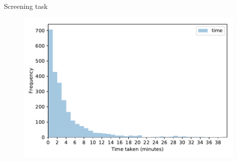 \documentclass[9pt]{beamer}
\begin{document}
\begin{frame}{Screening task}

\begin{figure}
	\includegraphics[width=\linewidth]{../plots/progress/time_taken_hist.pdf}
\end{figure}

\end{frame}

\end{document}

